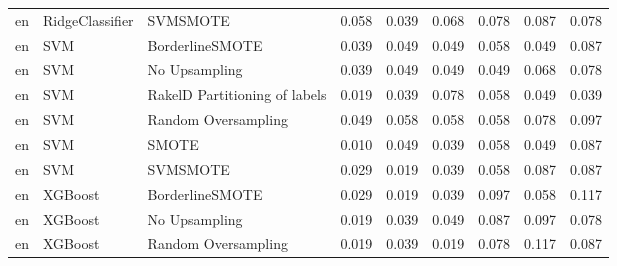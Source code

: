 \begin{tabular}{lllllllll}
      en &                 RidgeClassifier &                      SVMSMOTE &     0.058 &                     0.039 &                 0.068 &                  0.078 &                                   0.087 &     0.078 \\
      en &                             SVM &               BorderlineSMOTE &     0.039 &                     0.049 &                 0.049 &                  0.058 &                                   0.049 &     0.087 \\
      en &                             SVM &                 No Upsampling &     0.039 &                     0.049 &                 0.049 &                  0.049 &                                   0.068 &     0.078 \\
      en &                             SVM & RakelD Partitioning of labels &     0.019 &                     0.039 &                 0.078 &                  0.058 &                                   0.049 &     0.039 \\
      en &                             SVM &           Random Oversampling &     0.049 &                     0.058 &                 0.058 &                  0.058 &                                   0.078 &     0.097 \\
      en &                             SVM &                         SMOTE &     0.010 &                     0.049 &                 0.039 &                  0.058 &                                   0.049 &     0.087 \\
      en &                             SVM &                      SVMSMOTE &     0.029 &                     0.019 &                 0.039 &                  0.058 &                                   0.087 &     0.087 \\
      en &                         XGBoost &               BorderlineSMOTE &     0.029 &                     0.019 &                 0.039 &                  0.097 &                                   0.058 &     0.117 \\
      en &                         XGBoost &                 No Upsampling &     0.019 &                     0.039 &                 0.049 &                  0.087 &                                   0.097 &     0.078 \\
      en &                         XGBoost &           Random Oversampling &     0.019 &                     0.039 &                 0.019 &                  0.078 &                                   0.117 &     0.087 \\

\end{tabular}
